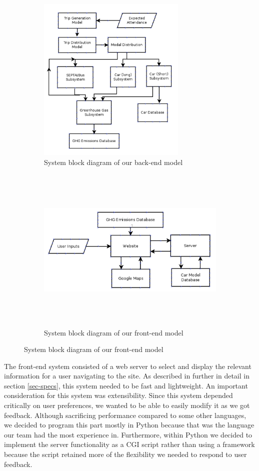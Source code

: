 \begin{figure}[htp]
  \centering
  \begin{subfigure}{.4\textwidth}
    \centering
    \includegraphics[height=8cm]{graphics/backend.png}
    \caption{System block diagram of our back-end model}
    \label{fig-back-end}
  \end{subfigure}
  \begin{subfigure}{.4\textwidth}
    \centering
    \includegraphics[height=8cm]{graphics/frontend.png}
    \caption{System block diagram of our front-end model}
    \label{fig-front-end}
  \end{subfigure}
\end{figure}

The front-end system consisted of a web server to select and display
the relevant information for a user navigating to the site. As
described in further in detail in section \ref{sec-specs}, this system
needed to be fast and lightweight. An important consideration for this
system was extensibility. Since this system depended critically on
user preferences, we wanted to be able to easily modify it as we got
feedback. Although sacrificing performance compared to some other
languages, we decided to program this part mostly in Python because
that was the language our team had the most experience
in. Furthermore, within Python we decided to implement the server
functionality as a CGI script rather than using a framework because
the script retained more of the flexibility we needed to respond to
user feedback.

